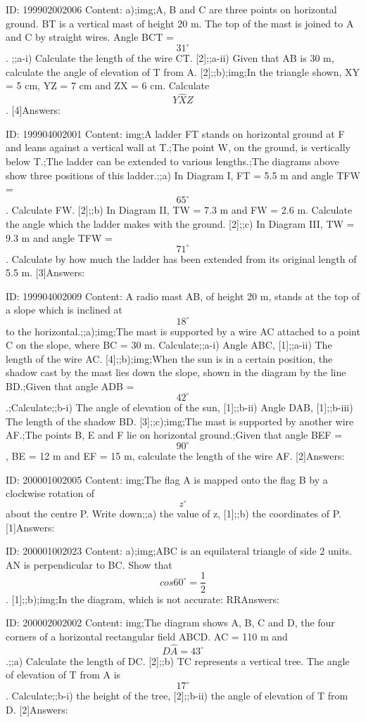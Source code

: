 \documentclass{article}
\begin{document}
ID: 199902002006
Content:
a);img;A, B and C are three points on horizontal ground. BT is a vertical mast of height 20 m. The top of the mast is joined to A and C by straight wires. Angle BCT = $$31^{\circ}$$. ;;a-i) Calculate the length of the wire CT. [2];;a-ii) Given that AB is 30 m, calculate the angle of elevation of T from A. [2];;b);img;In the triangle shown, XY = 5 cm, YZ = 7 cm and ZX = 6 cm. Calculate $$Y \hat XZ$$. [4]Answers:

ID: 199904002001
Content:
img;A ladder FT stands on horizontal ground at F and leans against a vertical wall at T.;The point W, on the ground, is vertically below T.;The ladder can be extended to various lengths.;The diagrams above show three positions of this ladder.;;a) In Diagram I, FT = 5.5 m and angle TFW = $$65^{\circ}$$. Calculate FW. [2];;b) In Diagram II, TW = 7.3 m and FW = 2.6 m. Calculate the angle which the ladder makes with the ground. [2];;c) In Diagram III, TW = 9.3 m and angle TFW = $$71^{\circ}$$. Calculate by how much the ladder has been extended from its original length of 5.5 m. [3]Answers:

ID: 199904002009
Content:
A radio mast AB, of height 20 m, stands at the top of a slope which is inclined at $$18^{\circ}$$ to the horizontal.;;a);img;The mast is supported by a wire AC attached to a point C on the slope, where BC = 30 m. Calculate;;a-i) Angle ABC, [1];;a-ii) The length of the wire AC. [4];;b);img;When the sun is in a certain position, the shadow cast by the mast lies down the slope, shown in the diagram by the line BD.;Given that angle ADB = $$42^{\circ}$$.;Calculate;;b-i) The angle of elevation of the sun, [1];;b-ii) Angle DAB, [1];;b-iii) The length of the shadow BD. [3];;c);img;The mast is supported by another wire AF.;The points B, E and F lie on horizontal ground.;Given that angle BEF = $$90^{\circ}$$, BE = 12 m and EF = 15 m, calculate the length of the wire AF. [2]Answers:

ID: 200001002005
Content:
img;The flag A is mapped onto the flag B by a clockwise rotation of $$z^{\circ}$$ about the centre P. Write down;;a) the value of z, [1];;b) the coordinates of P. [1]Answers:

ID: 200001002023
Content:
a);img;ABC is an equilateral triangle of side 2 units. AN is perpendicular to BC. Show that $$cos 60^{\circ}=\frac{1}{2}$$. [1];;b);img;In the diagram, which is not accurate: RRAnswers:

ID: 200002002002
Content:
img;The diagram shows A, B, C and D, the four corners of a horizontal rectangular field ABCD. AC = 110 m and  $$D \hat A=43^{\circ}$$.;;a) Calculate the length of DC. [2];;b) TC represents a vertical tree. The angle of elevation of T from A is $$17^{\circ}$$. Calculate;;b-i) the height of the tree, [2];;b-ii) the angle of elevation of T from D. [2]Answers:
\end{document}
